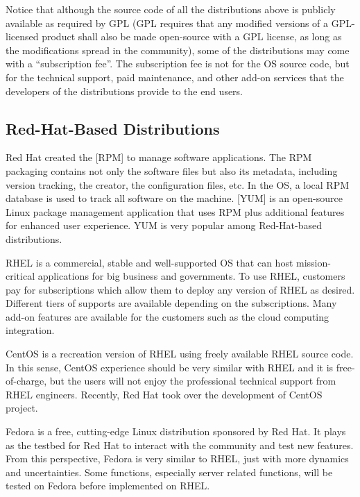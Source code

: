 Notice that although the source code of all the distributions above is publicly available as required by GPL (GPL requires that any modified versions of a GPL-licensed product shall also be made open-source with a GPL license, as long as the modifications spread in the community), some of the distributions may come with a ``subscription fee''. The subscription fee is not for the OS source code, but for the technical support, paid maintenance, and other add-on services that the developers of the distributions provide to the end users.
 
\subsection{Red-Hat-Based Distributions}

Red Hat created the [RPM] to manage software applications. The RPM packaging contains not only the software files but also its metadata, including version tracking, the creator, the configuration files, etc. In the OS, a local RPM database is used to track all software on the machine. [YUM] is an open-source Linux package management application that uses RPM plus additional features for enhanced user experience. YUM is very popular among Red-Hat-based distributions.

RHEL is a commercial, stable and well-supported OS that can host mission-critical applications for big business and governments. To use RHEL, customers pay for subscriptions which allow them to deploy any version of RHEL as desired. Different tiers of supports are available depending on the subscriptions. Many add-on features are available for the customers such as the cloud computing integration.

CentOS is a recreation version of RHEL using freely available RHEL source code. In this sense, CentOS experience should be very similar with RHEL and it is free-of-charge, but the users will not enjoy the professional technical support from RHEL engineers. Recently, Red Hat took over the development of CentOS project.

Fedora is a free, cutting-edge Linux distribution sponsored by Red Hat. It plays as the testbed for Red Hat to interact with the community and test new features. From this perspective, Fedora is very similar to RHEL, just with more dynamics and uncertainties. Some functions, especially server related functions, will be tested on Fedora before implemented on RHEL.

